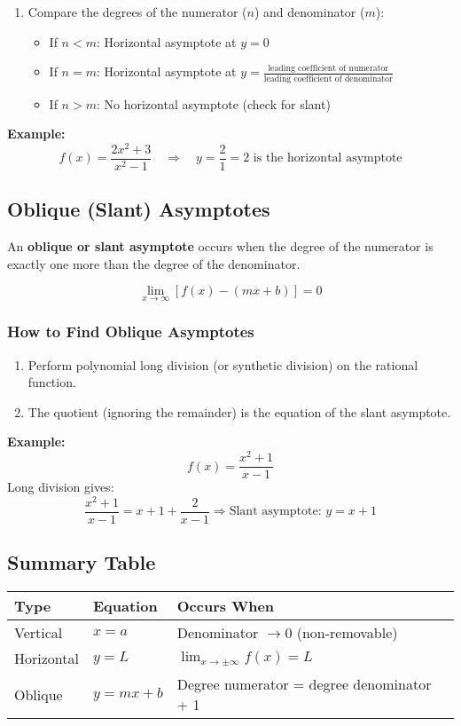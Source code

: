 \begin{enumerate}
    \item Compare the degrees of the numerator (\(n\)) and denominator (\(m\)):
    \begin{itemize}[label=\(-\)]
        \item If \(n < m\): Horizontal asymptote at \(y = 0\)
        \item If \(n = m\): Horizontal asymptote at \(y = \frac{\text{leading coefficient of numerator}}{\text{leading coefficient of denominator}}\)
        \item If \(n > m\): No horizontal asymptote (check for slant)
    \end{itemize}
\end{enumerate}

\textbf{Example:}
\[
f(x) = \frac{2x^2 + 3}{x^2 - 1} \quad \Rightarrow \quad y = \frac{2}{1} = 2 \text{ is the horizontal asymptote}
\]

\subsection{Oblique (Slant) Asymptotes}

An \textbf{oblique or slant asymptote} occurs when the degree of the numerator is exactly one more than the degree of the denominator.

\[
\lim_{x \to \infty} [f(x) - (mx + b)] = 0
\]

\subsubsection{How to Find Oblique Asymptotes}

\begin{enumerate}
    \item Perform polynomial long division (or synthetic division) on the rational function.
    \item The quotient (ignoring the remainder) is the equation of the slant asymptote.
\end{enumerate}

\textbf{Example:}
\[
f(x) = \frac{x^2 + 1}{x - 1}
\]
Long division gives:
\[
\frac{x^2 + 1}{x - 1} = x + 1 + \frac{2}{x - 1}
\Rightarrow \text{Slant asymptote: } y = x + 1
\]

\subsection{Summary Table}

\begin{center}
\begin{tabular}{|l|l|l|}
\hline
\textbf{Type} & \textbf{Equation} & \textbf{Occurs When} \\
\hline
Vertical      & \(x = a\)           & Denominator \(\to 0\) (non-removable) \\
Horizontal    & \(y = L\)           & \(\lim_{x \to \pm \infty} f(x) = L\) \\
Oblique       & \(y = mx + b\)      & Degree numerator = degree denominator + 1 \\
\hline
\end{tabular}
\end{center}

\newpage